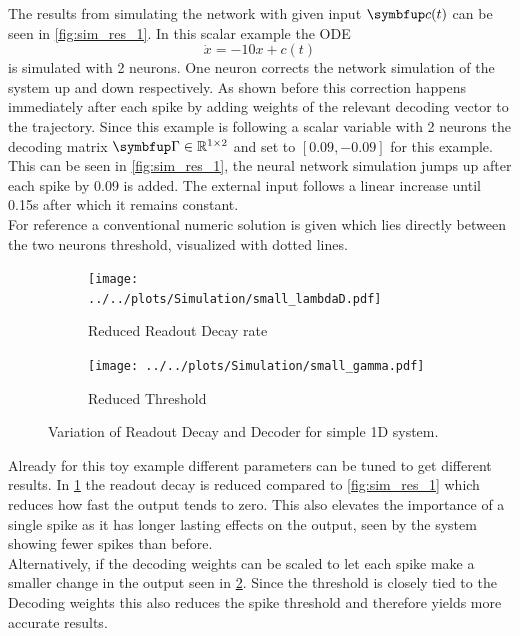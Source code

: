 The results from simulating the network with given input $\bmu{c}(t)$ can be seen in \cref{fig:sim_res_1}. In this scalar example the ODE
\begin{equation}\label{eq:leaky_integration_example}
\dot{x} = -10x +c(t)
\end{equation}
is simulated with 2 neurons. One neuron corrects the network simulation of the system up and down respectively. As shown before this correction happens immediately after each spike by adding weights of the relevant decoding vector to the trajectory. Since this example is following a scalar variable with 2 neurons the decoding matrix $\bmu{\Gamma}\in \mathbb{R}^{1\times2}$ and set to $\left[0.09,-0.09\right]$ for this example. This can be seen in \cref{fig:sim_res_1}, the neural network simulation jumps up after each spike by 0.09 is added. The external input follows a linear increase until 0.15s after which it remains constant.\\
For reference a conventional numeric solution is given which lies directly between the two neurons threshold, visualized with dotted lines.\\
\begin{figure}[h!]
	\centering
	\begin{subfigure}[t]{0.49\textwidth}
		\centering
		\texttt{[image: ../../plots/Simulation/small\_lambdaD.pdf]}
		\caption{Reduced Readout Decay rate}
		\label{fig:sim_low_lambda}
	\end{subfigure}
	\hfill
	\begin{subfigure}[t]{0.49\textwidth}
		\centering
		\texttt{[image: ../../plots/Simulation/small\_gamma.pdf]}
		\caption{Reduced Threshold}
		\label{fig:sim_low_gamma}
	\end{subfigure}
	\caption{Variation of Readout Decay and Decoder for simple 1D system.}
	\label{fig:sim_res_2}
\end{figure}
Already for this toy example different parameters can be tuned to get different results. In \cref{fig:sim_low_lambda} the readout decay is reduced compared to \cref{fig:sim_res_1} which reduces how fast the output tends to zero. This also elevates the importance of a single spike as it has longer lasting effects on the output, seen by the system showing fewer spikes than before.\\
Alternatively, if the decoding weights can be scaled to let each spike make a smaller change in the output seen in \cref{fig:sim_low_gamma}. Since the threshold is closely tied to the Decoding weights this also reduces the spike threshold and therefore yields more accurate results.\\


